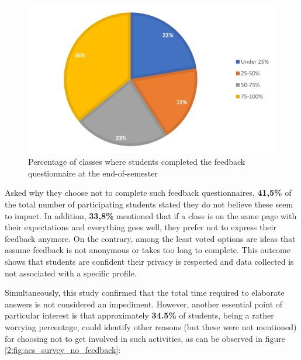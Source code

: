 	\begin{figure}[ht]
        \centering
             \includegraphics[height=0.3\textheight]{figures/charts/survey/number_classes_feedback_completed.png}
        \caption{Percentage of classes where students completed the feedback questionnaire at the end-of-semester}
        \label{2:fig:number_classes_feedback_completed}
    \end{figure}
	
	Asked why they choose not to complete such feedback questionnaires, \textbf{41,5\%} of the total number of participating students stated they do not believe these seem to impact. In addition, \textbf{33,8\%} mentioned that if a class is on the same page with their expectations and everything goes well, they prefer not to express their feedback anymore. On the contrary, among the least voted options are ideas that assume feedback is not anonymous or takes too long to complete. This outcome shows that students are confident their privacy is respected and data collected is not associated with a specific profile.
	
	Simultaneously, this study confirmed that the total time required to elaborate answers is not considered an impediment. However, another essential point of particular interest is that approximately \textbf{34.5\%} of students, being a rather worrying percentage, could identify other reasons (but these were not mentioned) for choosing not to get involved in such activities, as can be observed in figure \ref{2:fig:acs_survey_no_feedback}:
	
	\clearpage
	
